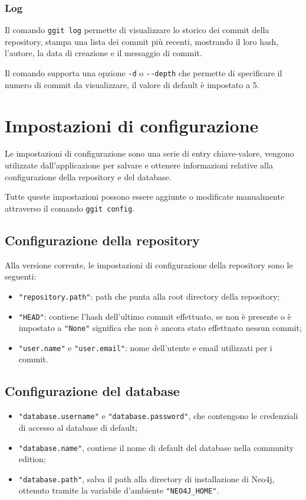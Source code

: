 \subsubsection{Log}
Il comando \texttt{ggit log} permette di visualizzare lo storico dei commit della repository, stampa una lista dei commit più recenti, mostrando il loro hash, l'autore, la data di creazione e il messaggio di commit.

Il comando supporta una opzione \texttt{-d} o \texttt{-{}-depth} che permette di specificare il numero di commit da visualizzare, il valore di default è impostato a 5.

\section{Impostazioni di configurazione}
\label{sec:impostazioni}
Le impostazioni di configurazione sono una serie di entry chiave-valore, vengono utilizzate dall'applicazione per salvare e ottenere informazioni relative alla configurazione della repository e del database.

Tutte queste impostazioni possono essere aggiunte o modificate manualmente attraverso il comando \texttt{ggit config}.

\subsection{Configurazione della repository}
Alla versione corrente, le impostazioni di configurazione della repository sono le seguenti:
\begin{itemize}
    \item \texttt{"repository.path"}: path che punta alla root directory della repository;
    \item \texttt{"HEAD"}: contiene l'hash dell'ultimo commit effettuato, se non è presente o è impostato a \texttt{"None"} significa che non è ancora stato effettuato nessun commit;
    \item \texttt{"user.name"} e \texttt{"user.email"}: nome dell'utente e email utilizzati per i commit.
\end{itemize}

\subsection{Configurazione del database}
\begin{itemize}
    \item \texttt{"database.username"} e \texttt{"database.password"}, che contengono le credenziali di accesso al database di default;
    \item \texttt{"database.name"}, contiene il nome di default del database nella community edition;
    \item \texttt{"database.path"}, salva il path alla directory di installazione di Neo4j, ottenuto tramite la variabile d'ambiente \texttt{"NEO4J\_HOME"}.
\end{itemize}

